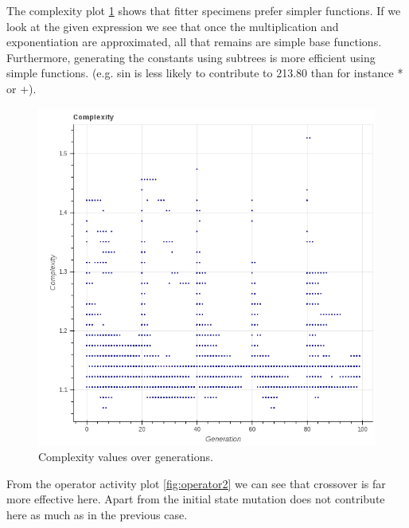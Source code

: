 \documentclass[10pt]{extarticle}
\begin{document}
The complexity plot \ref{fig:comp2} shows that fitter specimens prefer simpler functions. If we look at the given expression we see that once the multiplication and exponentiation are approximated, all that remains are simple base functions. Furthermore, generating the constants using subtrees is more efficient using simple functions. (e.g. sin is less likely to contribute to 213.80 than for instance * or +).
\begin{figure}[H]
	\caption{Complexity values over generations.}
	\label{fig:comp2}
	\includegraphics[scale=0.3]{figures/complexity2.png}
\end{figure}
From the operator activity plot  \ref{fig:operator2} we can see that crossover is far more effective here. Apart from the initial state mutation does not contribute here as much as in the previous case.
\end{document}
